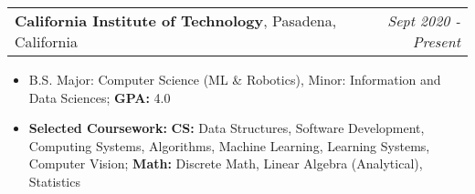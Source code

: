 \documentclass[letterpaper,11pt]{article}
\makeatletter
\newcommand{\resitem}[1]{\item #1 \vspace{-3pt}}
\newcommand{\edusubheading}[3]{
	\begin{tabular*}{7.0in}{l@{\extracolsep{\fill}}r}
		\textbf{#1}, #2 & \textit{#3} \\
\end{tabular*}\vspace{-6pt}}
\newcommand{\myitem}[1]{\item #1 \vspace{-8pt}}
\newcommand{\mysubitem}[1]{\item #1 \vspace{-4pt}}
\makeatother
\begin{document}

	\edusubheading{California Institute of Technology}{Pasadena, California}{Sept 2020 - Present}
		\begin{itemize}
			\myitem{B.S. Major: Computer Science (ML \& Robotics), Minor: Information and Data Sciences; \textbf{GPA:} 4.0}
			\myitem{\textbf{Selected Coursework:} \textbf{CS:} Data Structures, Software Development, Computing Systems, Algorithms, Machine Learning, Learning Systems, Computer Vision; \textbf{Math:} Discrete Math, Linear Algebra (Analytical), Statistics}
		\end{itemize}


\end{document}
